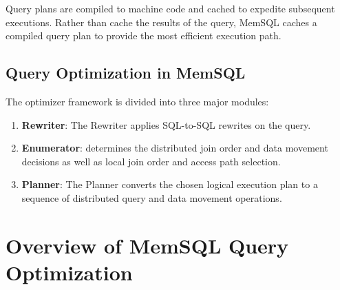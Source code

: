 \documentclass[11pt]{article}
\begin{document}
Query plans are compiled to machine code and cached to expedite subsequent executions. Rather than
cache the results of the query, MemSQL caches a compiled query plan to provide the most efficient
execution path.
\subsection{Query Optimization in MemSQL}
\label{sec:org0fc1f35}
The optimizer framework is divided into three major modules:
\begin{enumerate}
\item \textbf{Rewriter}: The Rewriter applies SQL-to-SQL rewrites on the query.
\item \textbf{Enumerator}: determines the distributed join order and data movement decisions as well as local join
order and access path selection.
\item \textbf{Planner}: The Planner converts the chosen logical execution plan to a sequence of distributed query
and data movement operations.
\end{enumerate}
\section{Overview of MemSQL Query Optimization}
\label{sec:orgf9dba41}
\end{document}
